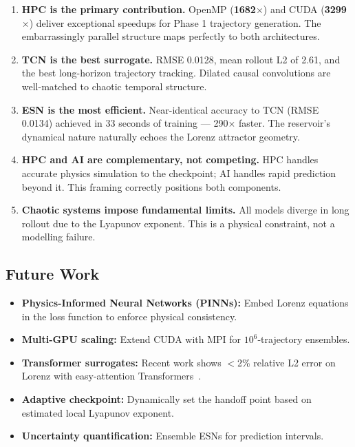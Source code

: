 \documentclass[11pt,a4paper]{article}
\newcommand{\good}[1]{{\color{OliveGreen}\textbf{#1}}}
\begin{document}
\begin{enumerate}
  \item \textbf{HPC is the primary contribution.} OpenMP (\good{1682$\times$}) and
        CUDA (\good{3299$\times$}) deliver exceptional speedups for Phase 1
        trajectory generation. The embarrassingly parallel structure maps perfectly
        to both architectures.

  \item \textbf{TCN is the best surrogate.} RMSE 0.0128, mean rollout L2 of 2.61,
        and the best long-horizon trajectory tracking. Dilated causal convolutions
        are well-matched to chaotic temporal structure.

  \item \textbf{ESN is the most efficient.} Near-identical accuracy to TCN (RMSE
        0.0134) achieved in 33 seconds of training --- 290$\times$ faster. The
        reservoir's dynamical nature naturally echoes the Lorenz attractor geometry.

  \item \textbf{HPC and AI are complementary, not competing.} HPC handles accurate
        physics simulation to the checkpoint; AI handles rapid prediction beyond it.
        This framing correctly positions both components.

  \item \textbf{Chaotic systems impose fundamental limits.} All models diverge in
        long rollout due to the Lyapunov exponent. This is a physical constraint,
        not a modelling failure.
\end{enumerate}

\newpage 

\subsection{Future Work}

\begin{itemize}
  \item \textbf{Physics-Informed Neural Networks (PINNs):} Embed Lorenz equations
        in the loss function to enforce physical consistency.
  \item \textbf{Multi-GPU scaling:} Extend CUDA with MPI for $10^6$-trajectory
        ensembles.
  \item \textbf{Transformer surrogates:} Recent work shows $<$2\% relative L2 error
        on Lorenz with easy-attention Transformers~\cite{raissi2019}.
  \item \textbf{Adaptive checkpoint:} Dynamically set the handoff point based on
        estimated local Lyapunov exponent.
  \item \textbf{Uncertainty quantification:} Ensemble ESNs for prediction intervals.
\end{itemize}
\end{document}
